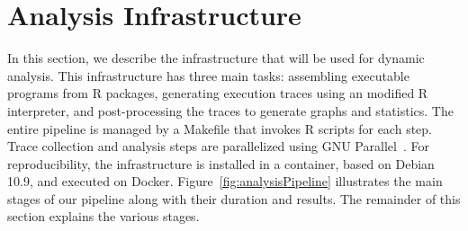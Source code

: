 \documentclass[10pt,review,sigplan,anonymous=true,authorversion=true,nonacm=true]{acmart}
\begin{document}
\begin{figure*}[h!]
  \caption{Analysis Pipeline}\label{fig:analysisPipeline}
\end{figure*}

\section{Analysis Infrastructure}

In this section, we describe the infrastructure that will be used for dynamic
analysis. This infrastructure has three main tasks: assembling executable
programs from R packages, generating execution traces using an modified R
interpreter, and post-processing the traces to generate graphs and statistics.
The entire pipeline is managed by a Makefile that invokes R scripts for each
step. Trace collection and analysis steps are parallelized using GNU
Parallel~\cite{gnuparallel}. For reproducibility, the infrastructure is
installed in a container, based on Debian 10.9, and executed on Docker.
Figure~\ref{fig:analysisPipeline} illustrates the main stages of our pipeline
along with their duration and results. The remainder of this section explains
the various stages.
\end{document}
